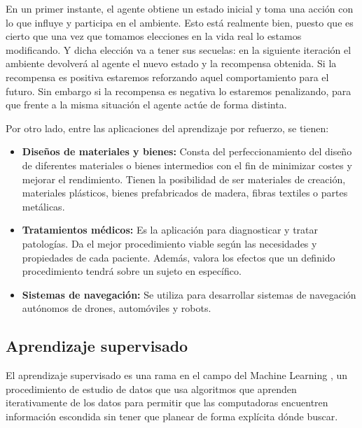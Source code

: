 En un primer instante, el agente obtiene un estado inicial y toma una acción con lo que influye y participa en el ambiente. Esto está realmente bien, puesto que es cierto que una vez que tomamos elecciones en la vida real lo estamos modificando. Y dicha elección va a tener sus secuelas: en la siguiente iteración el ambiente devolverá al agente el nuevo estado y la recompensa obtenida. Si la recompensa es positiva estaremos reforzando aquel comportamiento para el futuro. Sin embargo si la recompensa es negativa lo estaremos penalizando, para que frente a la misma situación el agente actúe de forma distinta.\par


Por otro lado, entre las aplicaciones del aprendizaje por refuerzo, se tienen:

\begin{itemize}

    \item \textbf{Diseños de materiales y bienes:} Consta del perfeccionamiento del diseño de diferentes materiales o bienes intermedios con el fin de minimizar costes y mejorar el rendimiento. Tienen la posibilidad de ser materiales de creación, materiales plásticos, bienes prefabricados de madera, fibras textiles o partes metálicas.
    \item \textbf{Tratamientos médicos:  }Es la aplicación para diagnosticar y tratar patologías. Da el mejor procedimiento viable según las necesidades y propiedades de cada paciente. Además, valora los efectos que un definido procedimiento tendrá sobre un sujeto en específico.
    \item \textbf{Sistemas de navegación:} Se utiliza para desarrollar sistemas de navegación autónomos de drones, automóviles y robots.
    
\end{itemize}

\subsection{Aprendizaje supervisado}
El aprendizaje supervisado es una rama en el campo del Machine Learning , un procedimiento de estudio de datos que usa algoritmos que aprenden iterativamente de los datos para permitir que las computadoras encuentren información escondida sin tener que planear de forma explícita dónde buscar. \par 

